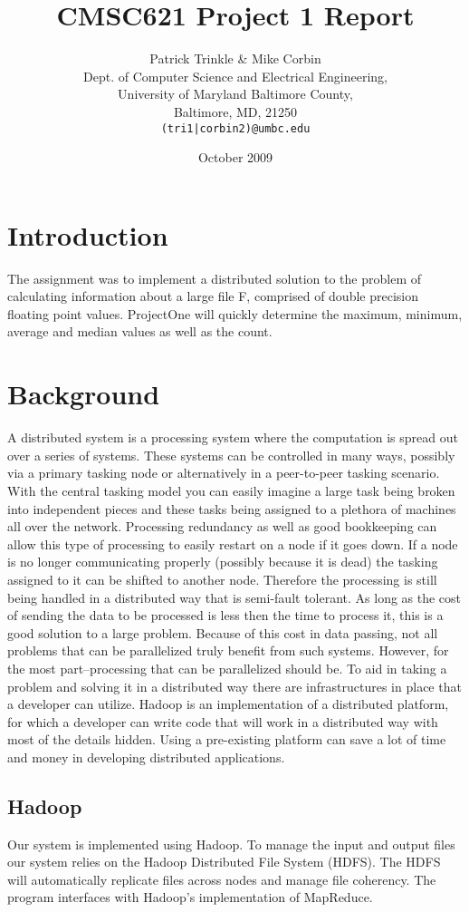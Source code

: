 \documentclass[11pt]{article}
\title{CMSC621 Project 1 Report}
\author{Patrick Trinkle \& Mike Corbin\\
Dept. of Computer Science and Electrical Engineering,\\
University of Maryland Baltimore County,\\
Baltimore, MD, 21250\\
\texttt{(tri1|corbin2)@umbc.edu}}
\date{October 2009}
\begin{document}
\maketitle

\section{Introduction}
The assignment was to implement a distributed solution to the problem of calculating information about a large file F, comprised of double precision floating point values.  ProjectOne will quickly determine the maximum, minimum, average and median values as well as the count.

\section{Background}
A distributed system is a processing system where the computation is spread out over a series of systems.  These systems can be controlled in many ways, possibly via a primary tasking node or alternatively in a peer-to-peer tasking scenario.  With the central tasking model you can easily imagine a large task being broken into independent pieces and these tasks being assigned to a plethora of machines all over the network.  Processing redundancy as well as good bookkeeping can allow this type of processing to easily restart on a node if it goes down.  If a node is no longer communicating properly (possibly because it is dead) the tasking assigned to it can be shifted to another node.  Therefore the processing is still being handled in a distributed way that is semi-fault tolerant.  As long as the cost of sending the data to be processed is less then the time to process it, this is a good solution to a large problem.  Because of this cost in data passing, not all problems that can be parallelized truly benefit from such systems.  However, for the most part--processing that can be parallelized should be.  To aid in taking a problem and solving it in a distributed way there are infrastructures in place that a developer can utilize.  Hadoop is an implementation of a distributed platform, for which a developer can write code that will work in a distributed way with most of the details hidden.  Using a pre-existing platform can save a lot of time and money in developing distributed applications.

\subsection*{Hadoop}
Our system is implemented using Hadoop.  To manage the input and output files our system relies on the Hadoop Distributed File System (HDFS).  The HDFS will automatically replicate files across nodes and manage file coherency.  The program interfaces with Hadoop's implementation of MapReduce.
\end{document}
